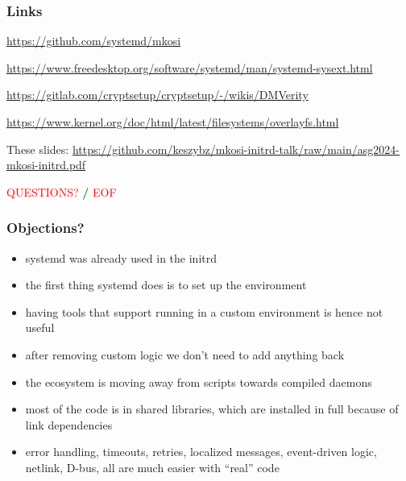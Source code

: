 \documentclass[]{beamer}
\newcommand\pp\pause
\begin{document}
\begin{frame}[fragile]
  \frametitle{Links}

  \url{https://github.com/systemd/mkosi}

  \url{https://www.freedesktop.org/software/systemd/man/systemd-sysext.html}

  {
    \small
    \url{https://gitlab.com/cryptsetup/cryptsetup/-/wikis/DMVerity}\\
    }

  \url{https://www.kernel.org/doc/html/latest/filesystems/overlayfs.html}

  \quad

  These slides:
  \url{https://github.com/keszybz/mkosi-initrd-talk/raw/main/asg2024-mkosi-initrd.pdf}

  \quad
  \pp

  \hfill \textcolor{red}{QUESTIONS?} \textcolor{green}{\bf /} \textcolor{red}{EOF} \hfill{}
\end{frame}

\begin{frame}
\end{frame}

\begin{frame}
  \frametitle{Objections?}


  \begin{itemize}
    \pp
    \item
      systemd was already used in the initrd
    \pp
    \item
      the first thing systemd does is to set up the environment
    \pp
    \item
      having tools that support running in a custom environment is hence not useful
    \pp
    \item
      after removing custom logic we don't need to add anything back
    \pp
    \item
      the ecosystem is moving away from scripts towards compiled daemons
    \pp
    \item
      most of the code is in shared libraries, which are installed in full because of link dependencies
    \pp
    \item
      error handling, timeouts, retries, localized messages, event-driven logic, netlink,
      D-bus, all are much easier with ``real'' code
  \end{itemize}
\end{frame}
\end{document}
